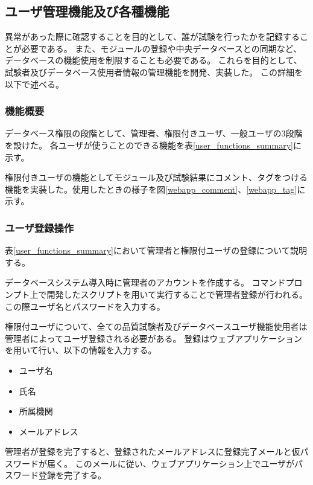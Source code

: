 \clearpage

\subsection{ユーザ管理機能及び各種機能}

異常があった際に確認することを目的として、誰が試験を行ったかを記録することが必要である。
また、モジュールの登録や中央データベースとの同期など、データベースの機能使用を制限することも必要である。
これらを目的として、試験者及びデータベース使用者情報の管理機能を開発、実装した。
この詳細を以下で述べる。

\subsubsection{機能概要}
データベース権限の段階として、管理者、権限付きユーザ、一般ユーザの3段階を設けた。
各ユーザが使うことのできる機能を表\ref{user_functions_summary}に示す。

権限付きユーザの機能としてモジュール及び試験結果にコメント、タグをつける機能を実装した。使用したときの様子を図\ref{webapp_comment}、\ref{webapp_tag}に示す。

\subsubsection{ユーザ登録操作}
表\ref{user_functions_summary}において管理者と権限付ユーザの登録について説明する。

データベースシステム導入時に管理者のアカウントを作成する。
コマンドプロンプト上で開発したスクリプトを用いて実行することで管理者登録が行われる。この際ユーザ名とパスワードを入力する。

権限付ユーザについて、全ての品質試験者及びデータベースユーザ機能使用者は管理者によってユーザ登録される必要がある。
登録はウェブアプリケーションを用いて行い、以下の情報を入力する。
\begin{itemize}
  \item ユーザ名 
  \item 氏名
  \item 所属機関
  \item メールアドレス 
\end{itemize}

管理者が登録を完了すると、登録されたメールアドレスに登録完了メールと仮パスワードが届く。
このメールに従い、ウェブアプリケーション上でユーザがパスワード登録を完了する。

